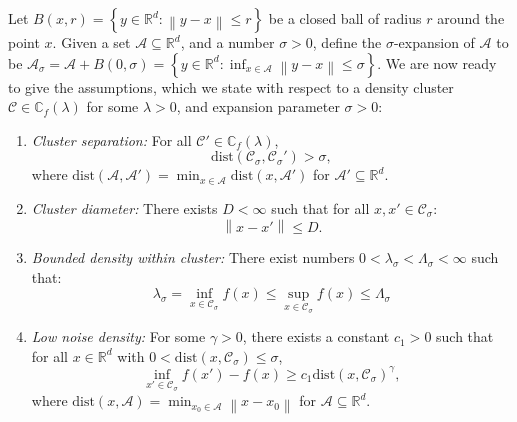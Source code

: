 \documentclass{article}
\newcommand{\diam}{\mathrm{diam}}
\newcommand{\set}[1]{\left\{#1\right\}}
\newcommand{\Reals}{\mathbb{R}}
\newcommand{\Rd}{\Reals^d}
\newcommand{\norm}[1]{\left\lVert#1\right\rVert}
\newcommand{\1}{\mathbf{1}}
\newcommand{\dist}{\mathrm{dist}}
\newcommand{\Cbb}{\mathbb{C}}
\newcommand{\Cset}{\mathcal{C}}
\newcommand{\Aset}{\mathcal{A}}
\newcommand{\Asig}{\Aset_{\sigma}}
\newcommand{\Csig}{\Cset_{\sigma}}
\theoremstyle{aldenthm}
\theoremstyle{aldenrmrk}
\begin{document}
Let $B(x,r) = \set{y \in \Rd: \norm{y - x} \leq r}$ be a closed ball of radius $r$ around the point $x$.  Given a set $\Aset \subseteq \Rd$, and a number $\sigma > 0$, define the $\sigma$-expansion of $\Aset$ to be $\Asig = \Aset + B(0,\sigma) = \set{y \in \Rd: \inf_{x \in \Aset} \norm{y - x} \leq \sigma}$. We are now ready to give the assumptions, which we state with respect to a density cluster $\Cset \in \Cbb_f(\lambda)$ for some $\lambda > 0$, and expansion parameter $\sigma > 0$:
\begin{enumerate}[label=(A\arabic*)]
	\item
	\label{asmp: cluster_separation}
	\textit{Cluster separation:}
	For all $\Cset' \in \Cbb_f(\lambda)$,
	\begin{equation*}
	\dist(\Csig,\Csig') > \sigma,
	\end{equation*}
	where $\dist(\Aset,\Aset') = \min_{x \in \Aset} \dist(x,\Aset')$ for $\Aset' \subseteq \Rd$. 
	
	\item
	\label{asmp: cluster_diameter}
	\textit{Cluster diameter:}
	There exists $D < \infty$ such that for all $x, x' \in \Csig$:
	\begin{equation*}
	\norm{x - x'} \leq D.
	\end{equation*}
	
	\item
	\label{asmp: bounded_density}
	\textit{Bounded density within cluster:} There exist numbers $0 < \lambda_{\sigma} <  \Lambda_{\sigma} < \infty$ such that:
	\begin{equation}
	\label{eqn: bounded_density}
	\lambda_{\sigma} = \inf_{x \in \Csig} f(x) \leq \sup_{x \in \Csig} f(x) \leq \Lambda_{\sigma} 
	\end{equation} 
	
	\item 
	\label{asmp: low_noise_density}
	\textit{Low noise density:} For some $\gamma > 0 $, there exists a constant $c_1 > 0$ such that for all $x \in \Rd$ with $0 < \dist(x, \Csig) \leq \sigma$,
	\begin{equation*}
	\inf_{x' \in \Csig} f(x') - f(x) \geq c_1 \dist(x, \Csig)^{\gamma},
	\end{equation*}
	where $\dist(x,\Aset) = \min_{x_0 \in \Aset} \norm{x - x_0}$ for $\Aset \subseteq \Rd$.
\end{enumerate}
\end{document}
